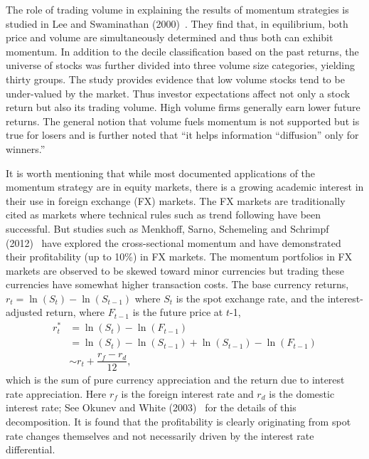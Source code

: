 The role of trading volume in explaining the results of momentum strategies is studied in Lee and Swaminathan (2000)~\cite{lee2000}. They find that, in equilibrium, both price and volume are simultaneously determined and thus both can exhibit momentum. In addition to the decile classification based on the past returns, the universe of stocks was further divided into three volume size categories, yielding thirty groups. The study provides evidence that low volume stocks tend to be under-valued by the market. Thus investor expectations affect not only a stock return but also its trading volume. High volume firms generally earn lower future returns. The general notion that volume fuels momentum is not supported but is true for losers and is further noted that ``it helps information ``diffusion'' only for winners.''


It is worth mentioning that while most documented applications of the momentum strategy are in equity markets, there is a growing academic interest in their use in foreign exchange (FX) markets. The FX markets are traditionally cited as markets where technical rules such as trend following have been successful. But studies such as Menkhoff, Sarno, Schemeling and Schrimpf (2012)~\cite{menkhoff2012} have explored the cross-sectional momentum and have demonstrated their profitability (up to 10\%) in FX markets. The momentum portfolios in FX markets are observed to be skewed toward minor currencies but trading these currencies have somewhat higher transaction costs. The base currency returns, $r_t= \ln(S_t) - \ln(S_{t-1})$ where $S_t$ is the spot exchange rate, and the interest-adjusted return, where $F_{t-1}$ is the future price at $t$-1,
	\begin{equation}
	\begin{split}
	r_t^* &= \ln(S_t) - \ln(F_{t-1}) \\
	&= \ln(S_t) - \ln(S_{t-1}) + \ln(S_{t-1}) - \ln(F_{t-1}) \\
	&\sim r_t + \dfrac{r_f - r_d}{12},
	\end{split}
	\end{equation}
which is the sum of pure currency appreciation and the return due to interest rate appreciation. Here $r_f$ is the foreign interest rate and $r_d$ is the domestic interest rate; See Okunev and White (2003)~\cite{okunev2003} for the details of this decomposition. It is found that the profitability is clearly originating from spot rate changes themselves and not necessarily driven by the interest rate differential.


